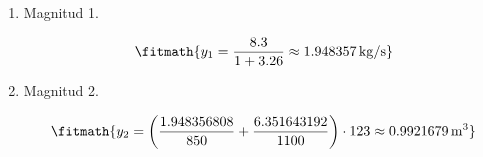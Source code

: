 \begin{enumerate}

\item Magnitud 1.

\[\fitmath{y_{1}=\frac{8.3}{1+3.26}\approx 1.948357\,\mathrm{kg/s}}\]

\item Magnitud 2.

\[\fitmath{y_{2}=\left(\frac{1.948356808}{850}+\frac{6.351643192}{1100}\right)\cdot 123\approx 0.9921679\,\mathrm{m^{3}}}\]

\end{enumerate}

